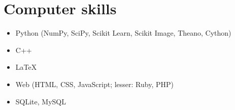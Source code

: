 \documentclass[a4paper,10pt]{report}
\begin{document}
\vspace{.15in}


\section{Computer skills}

{ \begin{itemize} \item Python (NumPy, SciPy, Scikit Learn, Scikit Image, Theano, Cython) \end{itemize}}{ \begin{itemize} \item C++ \end{itemize}}{ \begin{itemize} \item \LaTeX \end{itemize}}{ \begin{itemize} \item Web (HTML, CSS, JavaScript; lesser: Ruby, PHP) \end{itemize}}{ \begin{itemize} \item SQLite, MySQL \end{itemize}}
 
\end{document}
